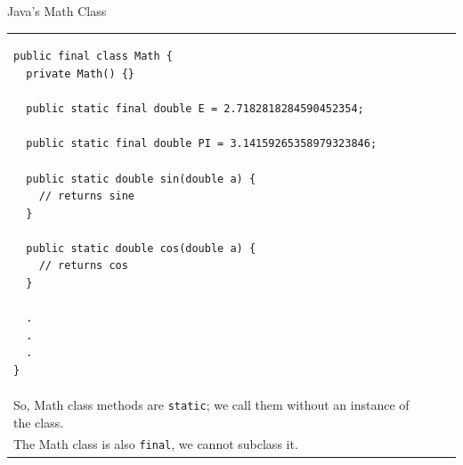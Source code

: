 \documentclass[aspectratio=169]{beamer}
\makeatletter
\newenvironment{splitslide}
{
\centering
\begin{tabular}{@{}p{0.50\textwidth} | p{0.025\textwidth}@{} p{0.4\textwidth}@{}}
}
{
\end{tabular}
}
\makeatother
\begin{document}
\begin{frame}[fragile]{Java's Math Class}
\begin{splitslide}

\begin{Verbatim}[fontsize=\tiny]
public final class Math {
  private Math() {}
  
  public static final double E = 2.7182818284590452354;
  
  public static final double PI = 3.14159265358979323846;
  
  public static double sin(double a) {
    // returns sine  
  }
  
  public static double cos(double a) {
    // returns cos  
  }
  
  .
  .
  .
}
\end{Verbatim}

&&

\raggedright
\vspace{1em}
\begin{footnotesize}
We don't need to incur the overhead of instantiating a class just to, say, take a cosine. There is no state (fields), and no reason to have instances of the class. \\
\vspace{0.5em}
So, Math class methods are \texttt{static}; we call them without an instance of the class. \\
\vspace{0.5em}
The Math class is also \texttt{final}, we cannot subclass it.
\end{footnotesize}

\end{splitslide}
\end{frame}
\end{document}
